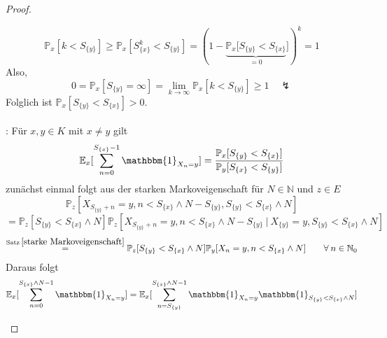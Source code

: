 \documentclass[a4paper,12pt]{scrartcl}
\theoremstyle{definition}
\begin{document}
\begin{proof}
\begin{itemize}
\begin{equation*}
\mathbb{P}_{x}[k < S_{\lbrace y \rbrace}] \geq \mathbb{P}_{x}[S_{\lbrace x \rbrace}^{k} < S_{\lbrace y \rbrace}] = \left( 1 - \underbrace{\mathbb{P}_{x}[S_{\lbrace y \rbrace} < S_{\lbrace x \rbrace}}_{=0}] \right)^{k} = 1
\end{equation*}
Also,
\begin{equation*}
0 = \mathbb{P}_{x}[S_{\lbrace y \rbrace} = \infty] = \lim_{k \to \infty} \mathbb{P}_{x}[k < S_{\lbrace y \rbrace}] \geq 1 \quad \lightning
\end{equation*}
Folglich ist $\mathbb{P}_{x}[S_{\lbrace y \rbrace} < S_{\lbrace x \rbrace}]>0.$
\\
\\
: Für $x,y \in K$ mit $x \neq y$ gilt 
\begin{equation*}
\mathbb{E}_{x}[\sum_{n=0}^{S_{\lbrace x \rbrace}-1} \mathbbm{1}_{X_{n} = y}] = \dfrac{\mathbb{P}_{x}[S_{\lbrace y \rbrace } < S_{\lbrace x \rbrace}]}{\mathbb{P}_{y}[S_{\lbrace x \rbrace } < S_{\lbrace y \rbrace}]}
\end{equation*}
zunächst einmal folgt aus der starken Markoveigenschaft für $N \in \mathbb{N}$ und $z \in E$
\begin{equation*}
\mathbb{P}_{z}[X_{S_{\lbrace y \rbrace} + n} = y, n < S_{\lbrace x \rbrace} \wedge N - S_{\lbrace y \rbrace}, S_{\lbrace y \rbrace} < S_{\lbrace x \rbrace} \wedge N]
\end{equation*}
\begin{equation*}
= \mathbb{P}_{z}[S_{\lbrace y \rbrace} < S_{\lbrace x \rbrace} \wedge N] \mathbb{P}_{z}[X_{S_{\lbrace y \rbrace} + n} = y, n < S_{\lbrace x \rbrace} \wedge N - S_{\lbrace y \rbrace} \: | \: X_{\lbrace y \rbrace} = y,S_{\lbrace y \rbrace} < S_{\lbrace x \rbrace} \wedge N]
\end{equation*}
\begin{equation*}
\stackrel{\mathrm{Satz \: \ref{starke Markoveigenschaft}}}{=} \mathbb{P}_{z}[S_{\lbrace y \rbrace} < S_{\lbrace x \rbrace} \wedge N] \mathbb{P}_{y}[X_{n} = y, n < S_{\lbrace x \rbrace} \wedge N] \qquad \forall \: n \in \mathbb{N}_{0}
\end{equation*}
Daraus folgt
\begin{equation*}
\mathbb{E}_{x}[\sum_{n=0}^{S_{\lbrace x \rbrace} \wedge N -1}  \mathbbm{1}_{X_{n} = y}] = \mathbb{E}_{x}[\sum_{n=S_{\lbrace y \rbrace}}^{S_{\lbrace x \rbrace} \wedge N -1}  \mathbbm{1}_{X_{n} = y} \mathbbm{1}_{S_{\lbrace y \rbrace} < S_{\lbrace x \rbrace} \wedge N}]
\end{equation*}

\end{itemize}
\end{proof}
\end{document}
